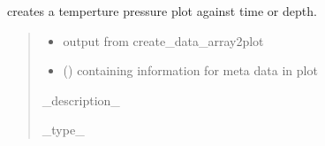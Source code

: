 \documentclass[letterpaper,10pt,english]{sphinxmanual}
\begin{document}
\begin{fulllineitems}
\begin{fulllineitems}
\begin{quote}
\begin{description}
\end{description}\end{quote}

\end{fulllineitems}


\begin{fulllineitems}
\label{\detokenize{tscw_module:tscw_module.tscw_DataClassesOutput.TSCW_Output.create_pT_plot}}
\pysigstartsignatures
{}
\pysigstopsignatures
\sphinxAtStartPar
creates a temperture \sphinxhyphen{} pressure plot against time or depth.
\begin{quote}\begin{description}
\begin{itemize}
\item {} 
\sphinxAtStartPar
{} \textendash{} output from create\_data\_array2plot

\item {} 
\sphinxAtStartPar
{} () \textendash{} containing information for meta data in plot

\end{itemize}

\sphinxAtStartPar
\_description\_

\sphinxAtStartPar
\_type\_

\end{description}\end{quote}

\end{fulllineitems}


\end{fulllineitems}

\end{document}
